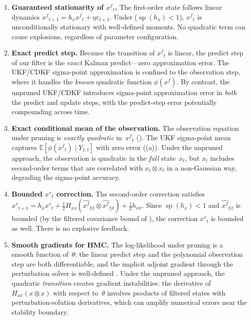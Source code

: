 \documentclass[12pt,a4paper]{article}
\newcommand{\E}{\mathbb{E}}
\newcommand{\kron}{\otimes}
\newcommand{\xf}{{x^{f}}}
\newcommand{\xs}{{x^{s}}}
\newcommand{\hx}{h_x}
\newcommand{\Hxx}{H_{xx}}
\newcommand{\hsig}{{h_{\sigma\sigma}}}
\DeclareMathOperator{\specrad}{sp}
\begin{document}
\begin{enumerate}[nosep]
\item \textbf{Guaranteed stationarity of $\xf_t$.}
The first-order state follows linear dynamics
$\xf_{t+1} = \hx\xf_t + \eta\varepsilon_{t+1}$. Under
 ($\specrad(\hx) < 1$), $\xf_t$ is unconditionally
stationary with well-defined moments. No quadratic term can cause
explosions, regardless of parameter configuration.

\item \textbf{Exact predict step.}
Because the transition of $\xf_t$ is linear, the predict step of
our filter is the \emph{exact} Kalman predict---zero approximation
error. The UKF/CDKF sigma-point approximation is confined to the
observation step, where it handles the \emph{known} quadratic
function $\phi(\xf)$. By contrast, the unpruned UKF/CDKF
introduces sigma-point approximation error in \emph{both} the
predict and update steps, with the predict-step error potentially
compounding across time.

\item \textbf{Exact conditional mean of the observation.}
The observation equation under pruning is \emph{exactly quadratic}
in~$\xf_t$ (). The UKF sigma-point mean captures
$\E[\phi(\xf_t) \mid Y_{1:t}]$ with zero error
((a)). Under the unpruned approach, the
observation is quadratic in the \emph{full} state~$x_t$, but $x_t$
includes second-order terms that are correlated with $x_t \kron x_t$
in a non-Gaussian way, degrading the sigma-point accuracy.

\item \textbf{Bounded $\xs_t$ correction.}
The second-order correction satisfies
$\xs_{t+1} = \hx\xs_t + \tfrac{1}{2}\Hxx(\hat\xf_{t|t} \kron \hat\xf_{t|t}) + \tfrac{1}{2}\hsig$.
Since $\specrad(\hx) < 1$ and $\hat\xf_{t|t}$ is bounded (by the
filtered covariance bound of ), the
correction $\xs_t$ is bounded as well. There is no explosive
feedback.

\item \textbf{Smooth gradients for HMC.}
The log-likelihood under pruning is a smooth function of~$\theta$:
the linear predict step and the polynomial observation step are both
differentiable, and the implicit adjoint gradient through the
perturbation solver is well-defined \citep{childers2024differentiable}.
Under the unpruned approach, the quadratic \emph{transition} creates
gradient instabilities: the derivative of $\Hxx(x \kron x)$ with
respect to~$\theta$ involves products of filtered states with
perturbation-solution derivatives, which can amplify numerical
errors near the stability boundary.
\end{enumerate}
\end{document}
